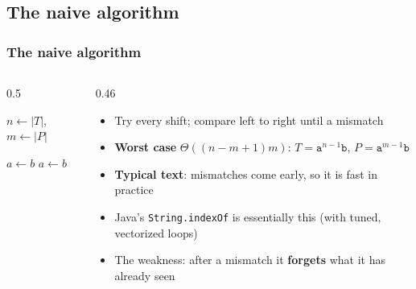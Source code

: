 \documentclass[aspectratio=169,10pt,compress]{beamer}
\begin{document}
\subsection[Naive]{The naive algorithm}




\begin{frame}[t,fragile] \frametitle{The naive algorithm}
  \begin{columns}[T]
    \begin{column}{0.5\textwidth}
      \SetAlFnt{\small}




\begin{algorithm}[H]
  \caption{NaiveMatcher($T$, $P$)}
  $n \leftarrow |T|$, \quad $m \leftarrow |P|$\;
      
  $a \gets b$	
  $a \gets b$	

\end{algorithm}


    \end{column}
    \begin{column}{0.46\textwidth}
      \begin{itemize}\small
        \item Try every shift; compare left to right until a mismatch
        \item \textbf{Worst case} $\Theta((n - m + 1) m)$: $T = \texttt{a}^{n-1}\texttt{b}$, $P = \texttt{a}^{m-1}\texttt{b}$
        \item \textbf{Typical text}: mismatches come early, so it is fast in practice
        \item Java's \texttt{String.indexOf} is essentially this (with tuned, vectorized loops)
        \item The weakness: after a mismatch it \textbf{forgets} what it has already seen
      \end{itemize}
    \end{column}
  \end{columns}
\end{frame}
\end{document}
